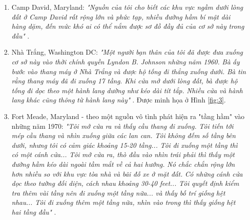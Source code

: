 \begin{flushleft}
\begin{enumerate}
    \item Camp David, Maryland: \textit{"Nguồn của tôi cho biết các khu vực ngầm dưới lòng đất ở Camp David rất rộng lớn và phức tạp, nhiều đường hầm bí mật dài hàng dặm, đến mức khó ai có thể nắm được sơ đồ đầy đủ của cơ sở này trong đầu"} \cite{22}.
    \item Nhà Trắng, Washington DC: \textit{"Một người bạn thân của tôi đã được đưa xuống cơ sở này vào thời chính quyền Lyndon B. Johnson những năm 1960. Bà ấy bước vào thang máy ở Nhà Trắng và được hộ tống đi thẳng xuống dưới. Bà tin rằng thang máy đã đi xuống 17 tầng. Khi cửa mở dưới lòng đất, bà được hộ tống đi dọc theo một hành lang dường như kéo dài tít tắp. Nhiều cửa và hành lang khác cũng thông từ hành lang này"} \cite{22}. Được minh họa ở Hình \ref{fig:3}.
    \item Fort Meade, Maryland - theo một nguồn vô tình phát hiện ra "tầng hầm" vào những năm 1970: \textit{"Tôi mở cửa ra và thấy cầu thang đi xuống. Tôi tiến tới mép cầu thang và nhìn xuống giữa các lan can. Tôi không đếm số tầng bên dưới, nhưng tôi có cảm giác khoảng 15-20 tầng... Tôi đi xuống một tầng thì có một cánh cửa... Tôi mở cửa ra, thò đầu vào nhìn trái phải thì thấy một đường hầm kéo dài ngoài tầm mắt về cả hai hướng. Nó chắc chắn rộng lớn hơn nhiều so với khu vực tòa nhà và bãi đỗ xe ở mặt đất. Có những cánh cửa dọc theo tường đối diện, cách nhau khoảng 30-40 feet... Tôi quyết định kiểm tra thêm vài tầng nên đi xuống một tầng nữa... và thấy bố trí giống hệt nhau... Tôi đi xuống thêm một tầng nữa, nhìn vào trong thì thấy giống hệt hai tầng đầu"} \cite{22}.
\end{enumerate}
\end{flushleft}
